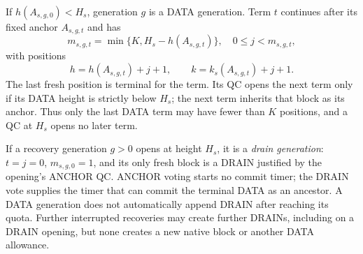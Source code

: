If $h(A_{s,g,0})<H_s$, generation $g$ is a DATA generation. Term $t$
continues after its fixed anchor $A_{s,g,t}$ and has
\begin{equation}
\label{eq:term-positions}
 m_{s,g,t}=\min\{K,H_s-h(A_{s,g,t})\},\quad
 0\le j<m_{s,g,t},
\end{equation}
with positions
\[
 h=h(A_{s,g,t})+j+1,\qquad
 k=k_s(A_{s,g,t})+j+1.
\]
The last fresh position is terminal for the term. Its QC opens the next
term only if its DATA height is strictly below $H_s$; the next term
inherits that block as its anchor. Thus only the last DATA term may
have fewer than $K$ positions, and a QC at $H_s$ opens no later term.

If a recovery generation $g>0$ opens at height $H_s$, it is a
\emph{drain generation}: $t=j=0$, $m_{s,g,0}=1$, and its only fresh block
is a DRAIN justified by the opening's ANCHOR QC. ANCHOR voting starts no
commit timer; the DRAIN vote supplies the timer that can commit the
terminal DATA as an ancestor. A DATA generation does not automatically
append DRAIN after reaching its quota. Further interrupted recoveries
may create further DRAINs, including on a DRAIN opening, but none creates
a new native block or another DATA allowance.

